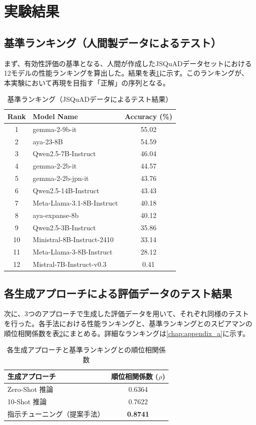 \documentclass[a4paper,11pt]{jreport}
\begin{document}
\section{実験結果}
\subsection{基準ランキング（人間製データによるテスト）}
まず、有効性評価の基準となる、人間が作成したJSQuADデータセットにおける12モデルの性能ランキングを算出した。結果を表\ref{tab:baseline_ranking}に示す。このランキングが、本実験において再現を目指す「正解」の序列となる。

\begin{table}[h]
  \centering
  \caption{基準ランキング（JSQuADデータによるテスト結果）}
  \label{tab:baseline_ranking}
  \begin{tabular}{clc}
    \hline
    Rank & Model Name & Accuracy (\%) \\
    \hline
    1 & gemma-2-9b-it & 55.02 \\
    2 & aya-23-8B & 54.59 \\
    3 & Qwen2.5-7B-Instruct & 46.04 \\
    4 & gemma-2-2b-it & 44.57 \\
    5 & gemma-2-2b-jpn-it & 43.76 \\
    6 & Qwen2.5-14B-Instruct & 43.43 \\
    7 & Meta-Llama-3.1-8B-Instruct & 40.18 \\
    8 & aya-expanse-8b & 40.12 \\
    9 & Qwen2.5-3B-Instruct & 35.86 \\
    10 & Ministral-8B-Instruct-2410 & 33.14 \\
    11 & Meta-Llama-3-8B-Instruct & 28.12 \\
    12 & Mistral-7B-Instruct-v0.3 & 0.41 \\
    \hline
  \end{tabular}
\end{table}

\subsection{各生成アプローチによる評価データのテスト結果}
次に、3つのアプローチで生成した評価データを用いて、それぞれ同様のテストを行った。各手法における性能ランキングと、基準ランキングとのスピアマンの順位相関係数を表\ref{tab:results_summary}にまとめる。詳細なランキングは\ref{chap:appendix_a}に示す。

\begin{table}[h]
  \centering
  \caption{各生成アプローチと基準ランキングとの順位相関係数}
  \label{tab:results_summary}
  \begin{tabular}{lc}
  \hline
  生成アプローチ       & 順位相関係数 ($\rho$) \\
  \hline
  Zero-Shot 推論       & 0.6364 \\
  10-Shot 推論         & 0.7622 \\
  指示チューニング（提案手法） & \textbf{0.8741} \\
  \hline
  \end{tabular}
\end{table}
\end{document}
